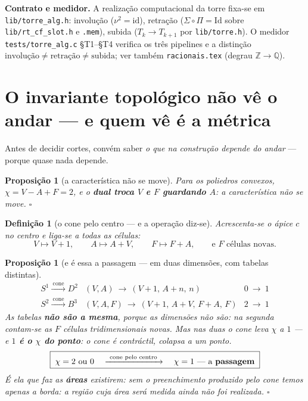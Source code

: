 \documentclass[11pt,a4paper]{article}
\newtheorem{proposicao}[teorema]{Proposição}
\newtheorem{definicao}{Definição}
\newcommand{\code}[1]{\texttt{\small #1}}
\begin{document}
\noindent\textbf{Contrato e medidor.} A realização computacional da torre
fixa-se em \code{lib/torre\_alg.h}: involução ($\nu^2=\mathrm{id}$),
retração ($\Sigma\circ\Pi=\mathrm{Id}$ sobre \code{lib/rt\_cf\_slot.h} e
\code{.mem}), subida ($T_k\to T_{k+1}$ por \code{lib/torre.h}). O medidor
\code{tests/torre\_alg.c} §T1--§T4 verifica os três pipelines e a distinção
$\text{involução}\neq\text{retração}\neq\text{subida}$; ver também
\code{racionais.tex} (degrau $\mathbb{Z}\to\mathbb{Q}$).

\section{O invariante topológico não vê o andar --- e quem vê é a
métrica}\label{sec:euler}

Antes de decidir cortes, convém saber \emph{o que na construção depende do andar} ---
porque quase nada depende.

\begin{proposicao}[a característica não se move]\label{prop:euler}
Para os poliedros convexos, $\chi=V-A+F=2$, e o \textbf{dual troca $V$ e $F$
guardando $A$}: a característica não se move. $\square$
\end{proposicao}

\begin{definicao}[o cone pelo centro --- e a operação diz-se]\label{def:cone-centro}
Acrescenta-se o ápice $c$ no centro e liga-se a todas as células:
\[
V\mapsto V+1,\qquad A\mapsto A+V,\qquad F\mapsto F+A,
\qquad\text{e } F \text{ células novas.}
\]
\end{definicao}

\begin{proposicao}[e é essa a passagem --- em duas dimensões, com tabelas
distintas]\label{prop:passagem}
\[
\boxed{
\begin{array}{lll}
S^{1}\xrightarrow{\ \text{cone}\ }D^{2}
 & (V,A)\ \to\ (V{+}1,\,A{+}n,\,n)
 & 0\ \longrightarrow\ 1\\[3pt]
S^{2}\xrightarrow{\ \text{cone}\ }B^{3}
 & (V,A,F)\ \to\ (V{+}1,\,A{+}V,\,F{+}A,\,F)
 & 2\ \longrightarrow\ 1
\end{array}}
\]
As tabelas \textbf{não são a mesma}, porque as dimensões não são: na segunda
contam-se as $F$ células tridimensionais novas. Mas nas duas o cone leva $\chi$ a
$1$ --- e \textbf{$1$ é o $\chi$ do ponto}: o cone é contráctil, colapsa a
\emph{um} ponto.
\[
\boxed{\;\chi=2\ \text{ou}\ 0 \quad\xrightarrow{\ \text{cone pelo centro}\ }\quad
\chi=1\ \text{---\ a \textbf{passagem}}\;}
\]
É ela que faz as \textbf{áreas} existirem: sem o preenchimento produzido pelo cone temos
apenas a borda: a região cuja área será medida ainda não foi realizada. $\square$
\end{proposicao}
\end{document}
